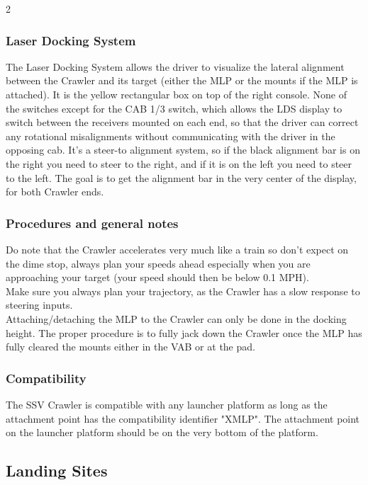 \documentclass[Space_Shuttle_Vessel_Manual.tex]{subfiles}
\begin{document}
\begin{multicols*}{2}
\subsubsection{Laser Docking System}
The Laser Docking System allows the driver to visualize the lateral alignment between the Crawler and its target (either the MLP or the mounts if the MLP is attached). It is the yellow rectangular box on top of the right console. None of the switches except for the CAB 1/3 switch, which allows the LDS display to switch between the receivers mounted on each end, so that the driver can correct any rotational misalignments without communicating with the driver in the opposing cab. It's a steer-to alignment system, so if the black alignment bar is on the right you need to steer to the right, and if it is on the left you need to steer to the left. The goal is to get the alignment bar in the very center of the display, for both Crawler ends.


\subsubsection{Procedures and general notes}
Do note that the Crawler accelerates very much like a train so don't expect on the dime stop, always plan your speeds ahead especially when you are approaching your target (your speed should then be below 0.1 MPH).\\
Make sure you always plan your trajectory, as the Crawler has a slow response to steering inputs.\\
Attaching/detaching the MLP to the Crawler can only be done in the docking height. The proper procedure is to fully jack down the Crawler once the MLP has fully cleared the mounts either in the VAB or at the pad.


\subsubsection{Compatibility}
The SSV Crawler is compatible with any launcher platform as long as the attachment point has the compatibility identifier "XMLP". The attachment point on the launcher platform should be on the very bottom of the platform.
\end{multicols*}
\newpage


\subsection{Landing Sites}
\label{sec:landing-sites}
\end{document}
